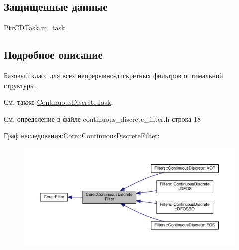 \subsection*{Защищенные данные}
\begin{DoxyCompactItemize}
\item 
\hyperlink{namespace_core_a4d5939b0284102299f3fb63d7552826a}{Ptr\+C\+D\+Task} \hyperlink{class_core_1_1_continuous_discrete_filter_a14b9176c461ca407005e653ecc987b1b}{m\+\_\+task}
\end{DoxyCompactItemize}


\subsection{Подробное описание}
Базовый класс для всех непрерывно-\/дискретных фильтров оптимальной структуры. 

\begin{DoxySeeAlso}{См. также}
\hyperlink{class_core_1_1_continuous_discrete_task}{Continuous\+Discrete\+Task}. 
\end{DoxySeeAlso}


См. определение в файле continuous\+\_\+discrete\+\_\+filter.\+h строка 18



Граф наследования\+:Core\+:\+:Continuous\+Discrete\+Filter\+:
\nopagebreak
\begin{figure}[H]
\begin{center}
\leavevmode
\includegraphics[width=350pt]{class_core_1_1_continuous_discrete_filter__inherit__graph}
\end{center}
\end{figure}


